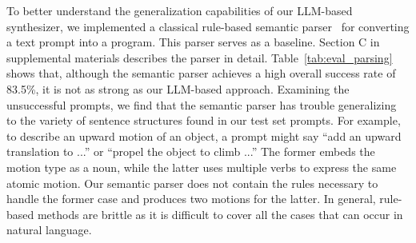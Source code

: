 To better understand the generalization capabilities of our LLM-based
\dslname{} synthesizer, we implemented a classical rule-based semantic
parser~\cite{kamath2018survey} for converting a text prompt into a
\dslname{} program. This parser serves as a baseline.
%
Section C in supplemental materials describes the parser in
detail.
%
%
Table~\ref{tab:eval_parsing} shows that, although the semantic
parser achieves a high overall success rate of 83.5\%, it is
not as strong as our LLM-based approach.
Examining the unsuccessful prompts, we find that the %
semantic parser
has trouble generalizing to the variety of sentence structures found in 
our test set prompts.
For example, to describe an upward motion of
an object, a prompt might say ``add an upward translation to ...'' or ``propel
the object to climb ...''  The former embeds the motion type
as a noun, while the latter uses multiple verbs to express the
same atomic motion. Our semantic parser does not contain the rules necessary to handle the former
case and produces two motions for the latter.
%
In general, rule-based methods are brittle as it is difficult to cover all
the cases that can occur in natural language. 
%
%

